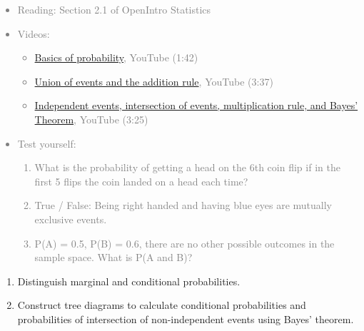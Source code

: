 \documentclass[11pt]{article}
\newcommand{\gray}[1]{\textcolor{gray}{#1}}
\begin{document}
\gray{
{\it
\vspace{-0.75cm}
\begin{itemize}
\renewcommand{\labelitemi}{{\textcolor{dark}{$\ast$}}}
\item Reading: Section 2.1 of OpenIntro Statistics
\item Videos:
\begin{itemize}
\item \href{http://www.youtube.com/watch?v=zMv-zcO8Jmk}{Basics of probability}, YouTube (1:42) 
\item \href{http://www.youtube.com/watch?v=DOooyE6liLY}{Union of events and the addition rule}, YouTube (3:37)
\item \href{http://www.youtube.com/watch?v=Q_7PR9kRXWs}{Independent events, intersection of events, multiplication rule, and Bayes' Theorem}, YouTube (3:25)
\end{itemize}
\item Test yourself:
\begin{enumerate}
\item What is the probability of getting a head on the 6th coin flip if in the first 5 flips the coin landed on a head each time?
\item True / False: Being right handed and having blue eyes are mutually exclusive events.
\item P(A) = 0.5, P(B) = 0.6, there are no other possible outcomes in the sample space. What is P(A and B)?
\end{enumerate}
\end{itemize}
}}


%

\vspace{0.25cm}

%

\begin{enumerate}[resume]
\renewcommand\labelenumi{\textcolor{light}{\textbf{LO \theenumi.}}}

\item Distinguish marginal and conditional probabilities.

\item Construct tree diagrams to calculate conditional probabilities and probabilities of intersection of non-independent events using Bayes' theorem.

\end{enumerate}
\end{document}
